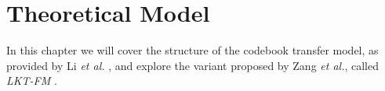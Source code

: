 \chapter{Theoretical Model}
\label{theoretical-model}

In this chapter we will cover the structure of the codebook transfer model, as provided by Li \textit{et al.} \cite{10.5555/1661445.1661773}, and explore the variant proposed by Zang \textit{et al.}, called \textit{LKT-FM} \cite{10.1007/978-3-319-71246-8_39}.